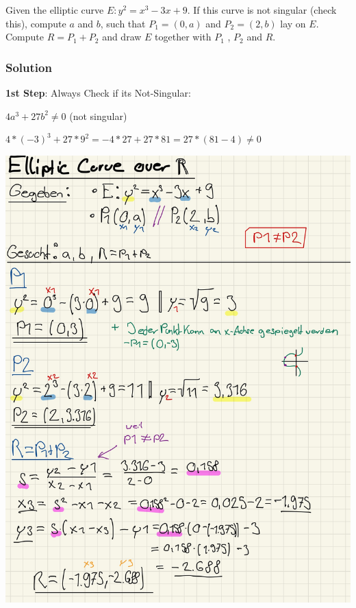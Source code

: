 \documentclass[11pt]{article}
\begin{document}
Given the elliptic curve \(E : y^2 = x^3 - 3x + 9\). If this curve is
not singular (check this), compute \(a\) and \(b\), such that
\(P_1 = (0,a)\) and \(P_2 = (2,b)\) lay on \(E\). Compute
\(R = P_1 +P_2\) and draw \(E\) together with \(P_1\) , \(P_2\) and
\(R\).

\hypertarget{solution}{%
\subsubsection{Solution}\label{solution}}

\textbf{1st Step}: Always Check if its Not-Singular:

\(4a^3+27b^2 \neq 0\) (not singular)

\(4*(-3)^3+27*9^2 = -4*27 + 27*81 = 27*(81-4) \neq 0\)

\begin{center}
	\includegraphics[scale=0.8]{img/ecurve1.jpg}
\end{center}


\newpage
\end{document}
